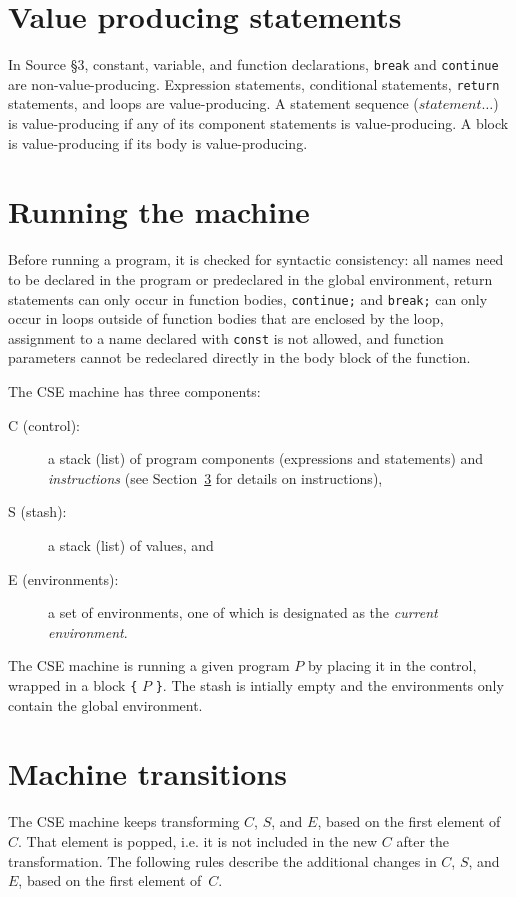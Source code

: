 \section{Value producing statements}

In Source \S 3, constant, variable, and function declarations, \lstinline{break}
and \lstinline{continue} are non-value-producing.
Expression statements, conditional statements, \lstinline{return} statements,
and loops are value-producing.
A statement sequence ($\textit{statement}\ldots$) is value-producing if any of its
component statements is value-producing. A block is value-producing if its body
is value-producing.

\section{Running the machine}

Before running a program, it is checked for syntactic consistency: all names need
to be declared in the program or predeclared in the global environment, return
statements can only occur in function bodies, \lstinline{continue;} and \lstinline{break;}
can only occur in loops outside of function bodies that are enclosed by the loop, assignment to a name declared with \lstinline{const} is not allowed, and function parameters cannot
be redeclared directly in the body block of the function.

The CSE machine has three components:
\begin{description}
\item[C (control):] a stack (list) of program components (expressions and statements) and \emph{instructions}
(see Section~\ref{transitions} for details on instructions),
\item[S (stash):] a stack (list) of values, and
\item[E (environments):] a set of environments, 
one of which is designated as the \emph{current environment}.
\end{description}
The CSE machine is running a given program $P$ by placing it in the control, wrapped
in a block \verb#{# $P$ \verb#}#. The stash is intially empty and the environments only
contain the global environment.

\section{Machine transitions}
\label{transitions}
The CSE machine keeps transforming $C$, $S$, and $E$, based on
the first element of $C$.
That element is popped, i.e. it is not
included in the new $C$ after the transformation. 
The following rules describe the additional
changes in $C$, $S$, and $E$, based on the first element of~$C$.

